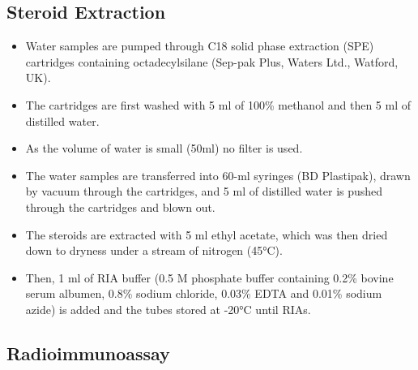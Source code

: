 \documentclass[
  letterpaper,
  DIV=11,
  numbers=noendperiod]{scrreprt}
\providecommand{\tightlist}{%
  \setlength{\itemsep}{0pt}\setlength{\parskip}{0pt}}\usepackage{longtable,booktabs,array}
\begin{document}
\hypertarget{steroid-extraction}{%
\subsection{Steroid Extraction}\label{steroid-extraction}}

\begin{itemize}
\tightlist
\item
  Water samples are pumped through C18 solid phase extraction (SPE)
  cartridges containing octadecylsilane (Sep-pak Plus, Waters Ltd.,
  Watford, UK).
\item
  The cartridges are first washed with 5 ml of 100\% methanol and then 5
  ml of distilled water.
\item
  As the volume of water is small (50ml) no filter is used.
\item
  The water samples are transferred into 60-ml syringes (BD Plastipak),
  drawn by vacuum through the cartridges, and 5 ml of distilled water is
  pushed through the cartridges and blown out.
\item
  The steroids are extracted with 5 ml ethyl acetate, which was then
  dried down to dryness under a stream of nitrogen (45°C).
\item
  Then, 1 ml of RIA buffer (0.5 M phosphate buffer containing 0.2\%
  bovine serum albumen, 0.8\% sodium chloride, 0.03\% EDTA and 0.01\%
  sodium azide) is added and the tubes stored at -20°C until RIAs.
\end{itemize}

\hypertarget{radioimmunoassay}{%
\subsection{Radioimmunoassay}\label{radioimmunoassay}}
\end{document}
